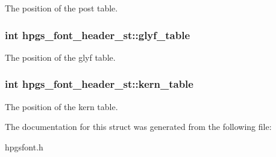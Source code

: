 The position of the post table. 
\subsubsection[glyf\_\-table]{\setlength{\rightskip}{0pt plus 5cm}int {\bf hpgs\_\-font\_\-header\_\-st::glyf\_\-table}}\label{structhpgs__font__header__st_8d9c804d2222a29fc5897a37da030f90}


The position of the glyf table. 
\subsubsection[kern\_\-table]{\setlength{\rightskip}{0pt plus 5cm}int {\bf hpgs\_\-font\_\-header\_\-st::kern\_\-table}}\label{structhpgs__font__header__st_d3548a900071302b64d154c9d3875ec2}


The position of the kern table. 

The documentation for this struct was generated from the following file:\begin{CompactItemize}
\item 
hpgsfont.h\end{CompactItemize}
